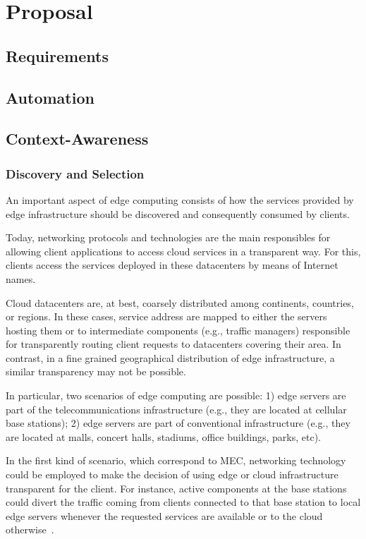 \section{Proposal}

\subsection{Requirements}

\subsection{Automation}



\subsection{Context-Awareness}



\subsubsection{Discovery and Selection }

An important aspect of edge computing consists of how the services provided by edge infrastructure should be discovered and consequently consumed by clients. 

Today, networking protocols and technologies are the main responsibles for allowing client applications to access cloud services in a transparent way. For this, clients access the services deployed in these datacenters by means of Internet names. 

Cloud datacenters are, at best, coarsely distributed among continents, countries, or regions. In these cases, service address are mapped to either the servers hosting them or to intermediate components (e.g., traffic managers) responsible for transparently routing client requests to datacenters covering their area. In contrast, in a fine grained geographical distribution of edge infrastructure, a similar transparency may not be possible. 

In particular, two scenarios of edge computing are possible: 1) edge servers are part of the telecommunications infrastructure (e.g., they are located at cellular base stations); 2) edge servers are part of conventional infrastructure  (e.g., they are located at malls, concert halls, stadiums, office buildings, parks, etc). 

In the first kind of scenario, which correspond to MEC, networking technology could be employed to make the decision of using edge or cloud infrastructure transparent for the client. For instance, active components at the base stations could divert the traffic coming from clients connected to that base station to local edge servers whenever the requested services are available or to the cloud otherwise~\cite{MEC_ROUTING}. 

